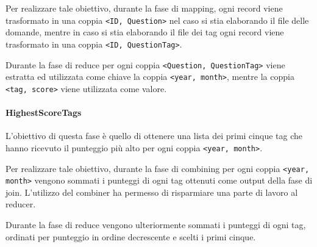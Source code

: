 \documentclass[10pt]{article}
\begin{document}
Per realizzare tale obiettivo, durante la fase di mapping, ogni record viene trasformato in una coppia \texttt{<ID, Question>} nel caso si stia elaborando il file delle domande, mentre in caso si stia elaborando il file dei tag ogni record viene trasformato in una coppia \texttt{<ID, QuestionTag>}.

Durante la fase di reduce per ogni coppia \texttt{<Question, QuestionTag>} viene estratta ed utilizzata come chiave la coppia \texttt{<year, month>}, mentre la coppia \texttt{<tag, score>} viene utilizzata come valore.

\paragraph{HighestScoreTags}

L'obiettivo di questa fase è quello di ottenere una lista dei primi cinque tag che hanno ricevuto il punteggio più alto per ogni coppia \texttt{<year, month>}.

Per realizzare tale obiettivo, durante la fase di combining per ogni coppia \texttt{<year, month>} vengono sommati i punteggi di ogni tag ottenuti come output della fase di join. L'utilizzo del combiner ha permesso di risparmiare una parte di lavoro al reducer.

Durante la fase di reduce vengono ulteriormente sommati i punteggi di ogni tag, ordinati per punteggio in ordine decrescente e scelti i primi cinque.

\begin{comment}

Please provide:
\begin{itemize}
\item Description of the implementation. A schematic and concise discussion is preferrable to a verbose narrative. Focus on how the data is manipulated in the job (e.g., what do keys and values represent across the different stages, what operations are carried out). 
\item Performance considerations with respect the (potentially) carried out optimizations, e.g., in terms of:
\begin{itemize}
\item allocated resources and tasks;
\item enforced partitioning;
\item data caching;
\item combiner usage;
\item broadcast variables usage;
\item any other kind of optimization.
\end{itemize}
\item Short extract of the output and discussion (i.e., whether there is any relevant insight obtained).
\end{itemize}

\end{comment}
\end{document}
